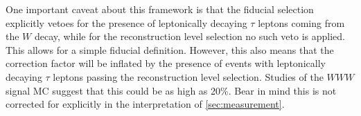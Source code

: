 One important caveat about this framework is that the fiducial selection explicitly vetoes
for the presence of leptonically decaying $\tau$ leptons coming from the $W$ decay, 
while for the reconstruction level selection no such veto is applied. 
This allows for a simple fiducial definition.
However, this also means that the correction factor will be inflated by the presence of 
events with leptonically decaying $\tau$ leptons passing the reconstruction
level selection. Studies of the $WWW$ signal MC suggest that this could be 
as high as 20\%. Bear in mind this is not corrected for explicitly in the interpretation
of \sec\ref{sec:measurement}.

